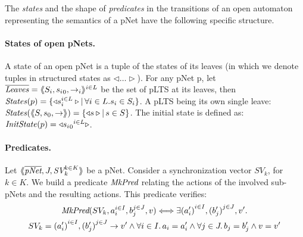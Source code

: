 \documentclass{lncs/llncs}
\newcommand{\TODO}[1]{\textcolor{red}{\textbf{[TODO:#1]}}}
\newcommand{\MkPred}{\symb{MkPred}}
\begin{document}
The \emph{states} and the shape of \emph{predicates} in the
transitions
of an open automaton representing the semantics of a pNet
have the following specific structure.

\paragraph{States of open pNets.}\label{def-states}
  A state of an open pNet is a tuple of the
  states of its leaves (in which we denote tuples
  in structured states as $\triangleleft\ldots\triangleright$).
  For any pNet p, let $\overline{\mathit{Leaves}} = \langle\hspace{-0.58ex}\langle S_i,{s_i}_0, \to_i\rangle\hspace{-0.58ex}\rangle^{i \in L}$ be the set of pLTS at its leaves,
  then $\mathit{States}(p) = \{\triangleleft{s_i^{i\in L}}\triangleright
  |\, \forall i\in L. s_i \in S_i\}$.
A pLTS being its own single leave:
  $\mathit{States}(\langle\hspace{-0.58ex}\langle S,s_0, \to\rangle\hspace{-0.58ex}\rangle) = \{\triangleleft{s}\triangleright|\, s \in S\}$.
The initial state is defined as:
$\mathit{InitState}(p) = \triangleleft{{{s_i}_0}^{i\in L}}\triangleright$.



\paragraph{Predicates.}
Let
$\mylangle\overline{\pNet},J,\symb{SV}_k^{k\in K} \myrangle$
be a pNet. Consider a synchronization vector $SV_k$, for $k\in K$. We build a
predicate $\MkPred$ relating
the actions of the involved sub-pNets and the resulting actions. This predicate verifies:
\begin{multline*}
  \MkPred(SV_k, a_i^{i\in I}, b_j^{j\in J}, v)\Longleftrightarrow
  \exists {(a'_i)}^{i\in I},
          {(b'_j)}^{j\in J},v'.\\
          SV_k={(a'_i)}^{i\in I}, {(b'_j)}^{j\in J}\rightarrow v'
          \land
          \forall i\in I.\, a_i=a'_i\land \forall j \in J.\, b_j=b'_j \land v=v'
\end{multline*}



\end{document}
